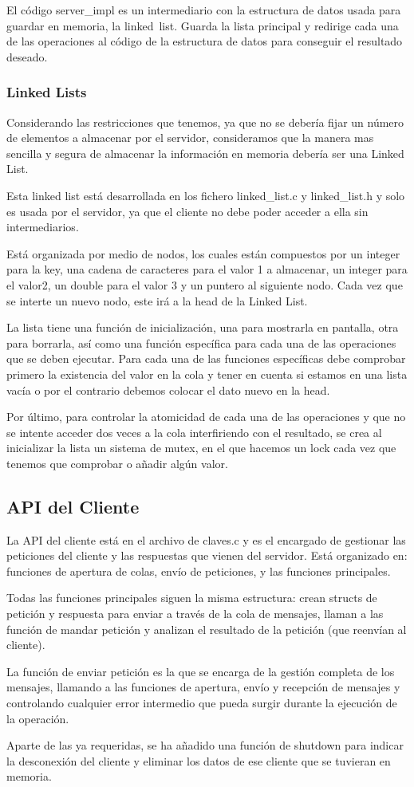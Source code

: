 El código server\_impl es un intermediario con la estructura de datos usada para guardar en memoria, la linked\ list. Guarda la lista principal y redirige cada una de las operaciones al código de la estructura de datos para conseguir el resultado deseado.

\subsubsection{Linked Lists}
Considerando las restricciones que tenemos, ya que no se debería fijar un número de elementos a almacenar por el servidor, consideramos que la manera mas sencilla y segura de almacenar la información en memoria debería ser una Linked List.

Esta linked list está desarrollada en los fichero linked\_list.c y linked\_list.h y solo es usada por el servidor, ya que el cliente no debe poder acceder a ella sin intermediarios. 

Está organizada por medio de nodos, los cuales están compuestos por un integer para la key, una cadena de caracteres para el valor 1 a almacenar, un integer para el valor2, un double para el valor 3 y un puntero al siguiente nodo. Cada vez que se interte un nuevo nodo, este irá a la head de la Linked List.

La lista tiene una función de inicialización, una para mostrarla en pantalla, otra para borrarla, así como una función específica para cada una de las operaciones que se deben ejecutar. Para cada una de las funciones específicas debe comprobar primero la existencia del valor en la cola y tener en cuenta si estamos en una lista vacía o por el contrario debemos colocar el dato nuevo en la head.

Por último, para controlar la atomicidad de cada una de las operaciones y que no se intente acceder dos veces a la cola interfiriendo con el resultado, se crea al inicializar la lista un sistema de mutex, en el que hacemos un lock cada vez que tenemos que comprobar o añadir algún valor.

\subsection{API del Cliente}
La API del cliente está en el archivo de claves.c y es el encargado de gestionar las peticiones del cliente y las respuestas que vienen del servidor. Está organizado en: funciones de apertura de colas, envío de peticiones, y las funciones principales. 

Todas las funciones principales siguen la misma estructura: crean structs de petición y respuesta para enviar a través de la cola de mensajes, llaman a las función de mandar petición y analizan el resultado de la petición (que reenvían al cliente).

La función de enviar petición es la que se encarga de la gestión completa de los mensajes, llamando a las funciones de apertura, envío y recepción de mensajes y controlando cualquier error intermedio que pueda surgir durante la ejecución de la operación.

Aparte de las ya requeridas, se ha añadido una función de shutdown para indicar la desconexión del cliente y eliminar los datos de ese cliente que se tuvieran en memoria.